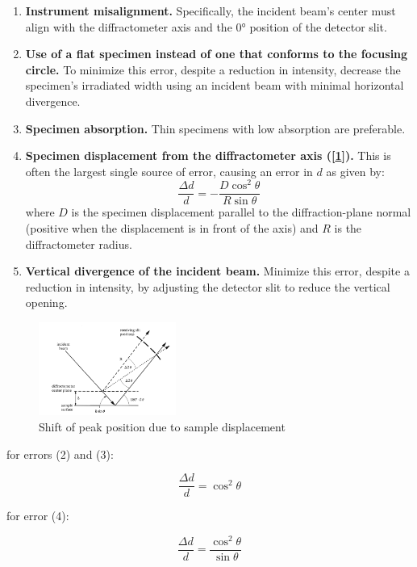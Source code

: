 \documentclass{article}
\begin{document}
\begin{enumerate}
    \item \textbf{Instrument misalignment.} Specifically, the incident beam's center must align with the diffractometer axis and the 0° position of the detector slit.
    \item \textbf{Use of a flat specimen instead of one that conforms to the focusing circle.} To minimize this error, despite a reduction in intensity, decrease the specimen's irradiated width using an incident beam with minimal horizontal divergence.
    \item \textbf{Specimen absorption.} Thin specimens with low absorption are preferable.
    \item \textbf{Specimen displacement from the diffractometer axis ([\ref{fig:peakshift}]).} This is often the largest single source of error, causing an error in \(d\) as given by:
       \[
       \frac{\Delta d}{d} = -\frac{D \cos^2 \theta}{R \sin \theta}
       \]
       where \(D\) is the specimen displacement parallel to the diffraction-plane normal (positive when the displacement is in front of the axis) and \(R\) is the diffractometer radius.
    \item \textbf{Vertical divergence of the incident beam.} Minimize this error, despite a reduction in intensity, by adjusting the detector slit to reduce the vertical opening.
\end{enumerate}

\pagebreak{}

\begin{figure}[h]
	\centering
	\includegraphics[width=0.4\textwidth]{Figures/peakshift.png}
	\caption{Shift of peak position due to sample displacement}
	\label{fig:peakshift}
\end{figure}

for errors (2) and (3):

\begin{equation}
	\label{eq:error1}
	\frac{\Delta d}{d} = \cos^2 \theta
\end{equation}

for error (4):

\begin{equation}
	\label{eq:error4}
	\frac{\Delta d}{d} = \frac{\cos^2 \theta}{\sin \theta}
\end{equation}
\end{document}
